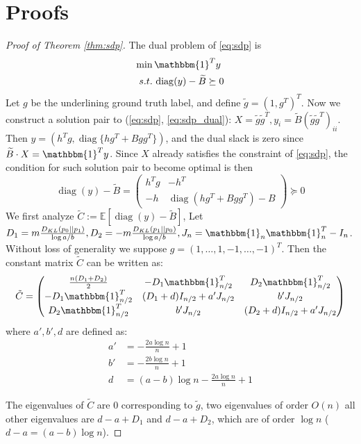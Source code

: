 \documentclass[conference]{IEEEtran}
\DeclareMathOperator{\diag}{diag}
\begin{document}
\section{Proofs}
\begin{proof}[Proof of Theorem \ref{thm:sdp}]
The dual problem of \eqref{eq:sdp} is
\begin{align}
\min\, & \mathbbm{1}^T y \notag \\
s.t.\,& \diag(y) - \widetilde{B} \succeq 0
\label{eq:sdp_dual}
\end{align}
Let $g$ be the underlining ground truth label, and
define $\tilde{g} = (1,g^T)^T$.
Now we construct a solution pair to (\ref{eq:sdp}, \ref{eq:sdp_dual}): $X=\tilde{g}\tilde{g}^T, y_i = \tilde{B}(\tilde{g}\tilde{g}^T)_{ii}$.
Then $y = (h^T g, \diag\{hg^T+Bgg^T\})$, and the dual slack is zero since $\widetilde{B} \cdot X = \mathbbm{1}^T y $.
Since $X$ already satisfies the constraint of \eqref{eq:sdp}, the condition for such solution pair to become optimal is then
$$
\diag(y) - \tilde{B}  = \begin{pmatrix} h^T g & -h^T \\ -h & \diag(hg^T + Bgg^T) - B \end{pmatrix}
\succeq 0
$$
We first analyze $\widetilde{C}:=\mathbb{E}[\diag(y) - \widetilde{B}]$, Let $D_1 = m\frac{D_{KL}(p_0||p_1)}{\log a/b},
D_2 = -m\frac{D_{KL}(p_1||p_0)}{\log a/b}, J_n = \mathbbm{1}_n \mathbbm{1}_n^T - I_n$.
Without loss of generality we suppose $g=(1, \dots, 1, -1, \dots, -1)^T$.
Then the constant matrix $\widetilde{C}$ can be written as:
{\scriptsize
\begin{equation*}
\tilde{C}=\begin{pmatrix}
\frac{n(D_1 + D_2)}{2} & -D_1 \mathbbm{1}_{n/2}^T & D_2 \mathbbm{1}_{n/2}^T \\
-D_1 \mathbbm{1}_{n/2}^T & (D_1 + d) I_{n/2} + a'J_{n/2}& b' J_{n/2} \\
D_2 \mathbbm{1}_{n/2}^T & b' J_{n/2} & (D_2 + d) I_{n/2} + a'J_{n/2}  
\end{pmatrix}
\end{equation*}
}
where $a',b', d$ are defined as:
\begin{align*}
a' & = - \frac{2a \log n}{n} + 1 \\
b' & = - \frac{2b \log n}{n} + 1 \\
d & = (a-b) \log n - \frac{2a \log n}{n} + 1
\end{align*}

The eigenvalues of $\tilde{C}$ are $0$ corresponding to $\tilde{g}$, two eigenvalues of order $O(n)$
all other eigenvalues are $d-a+D_1$ and $d-a+D_2$, which are of order $\log n$ ($d-a=(a-b)\log n$).


\end{proof}
\end{document}
